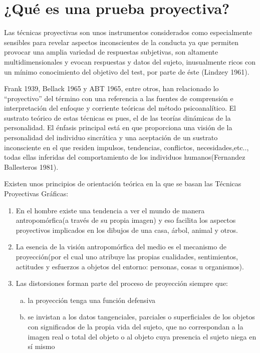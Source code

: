 \section{¿Qué es una prueba proyectiva?}

Las técnicas proyectivas son unos instrumentos considerados como especialmente sensibles para revelar aspectos inconscientes de la conducta ya que permiten provocar una amplia variedad de respuestas subjetivas, son altamente multidimensionales y evocan respuestas y datos del sujeto, inusualmente ricos con un mínimo conocimiento del objetivo del test, por parte de éste (Lindzey 1961).

Frank 1939, Bellack 1965 y ABT 1965, entre otros, han relacionado lo “proyectivo” del término con una referencia a las fuentes de comprensión e interpretación del enfoque y corriente teóricas del método psicoanalítico.
El sustrato teórico de estas técnicas es pues, el de las teorías dinámicas de la personalidad. El énfasis principal está en que proporciona una visión de la personalidad del individuo sincrática y una aceptación de un sustrato inconsciente en el que residen impulsos, tendencias, conflictos, necesidades,etc.., todas ellas inferidas del comportamiento de los individuos humanos(Fernandez Ballesteros 1981).

Existen unos principios de orientación teórica en la que se basan las Técnicas Proyectivas Gráficas:
\\
\begin{enumerate}[1)]
\item En el hombre existe una tendencia a ver el mundo de manera antropomórfica(a través de su propia imagen) y eso facilita los aspectos proyectivos implicados en los dibujos de una casa, árbol, animal y otros.
\item La esencia de la visión antropomórfica del medio es el mecanismo de proyección(por el cual uno atribuye las propias cualidades, sentimientos, actitudes y esfuerzos a objetos del entorno: personas, cosas u organismos).
\item Las distorsiones forman parte del proceso de proyección siempre que:
\begin{enumerate}[a)]
\item la proyección tenga una función defensiva
\item se invistan a los datos tangenciales, parciales o superficiales de los objetos con significados de la propia vida del sujeto, que no correspondan a la imagen real o total del objeto o al objeto cuya presencia el sujeto niega en sí mismo
\end{enumerate}
\end{enumerate}